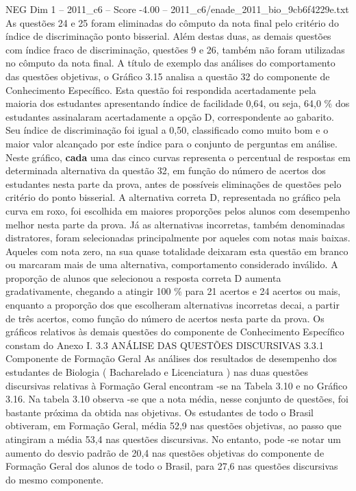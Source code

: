 \begin{textsample}{NEG Dim 1 – 2011\_c6 – Score -4.00 – 2011\_c6/enade\_2011\_bio\_9cb6f4229e.txt}
As questões 24 e 25 foram eliminadas do cômputo da nota final pelo critério do índice de discriminação ponto bisserial.
Além destas duas, as demais questões com índice fraco de discriminação, questões 9 e 26, também não foram utilizadas no cômputo da nota final.
A título de exemplo das análises do comportamento das questões objetivas, o Gráfico 3.15 analisa a questão 32 do componente de Conhecimento Específico.
Esta questão foi respondida acertadamente pela maioria dos estudantes apresentando índice de facilidade 0,64, ou seja, 64,0 \% dos estudantes assinalaram acertadamente a opção D, correspondente ao gabarito.
Seu índice de discriminação foi igual a 0,50, classificado como muito bom e o maior valor alcançado por este índice para o conjunto de perguntas em análise.
Neste gráfico, \textbf{cada} uma das cinco curvas representa o percentual de respostas em determinada alternativa da questão 32, em função do número de acertos dos estudantes nesta parte da prova, antes de possíveis eliminações de questões pelo critério do ponto bisserial.
A alternativa correta D, representada no gráfico pela curva em roxo, foi escolhida em maiores proporções pelos alunos com desempenho melhor nesta parte da prova.
Já as alternativas incorretas, também denominadas distratores, foram selecionadas principalmente por aqueles com notas mais baixas.
Aqueles com nota zero, na sua quase totalidade deixaram esta questão em branco ou marcaram mais de uma alternativa, comportamento considerado inválido.
A proporção de alunos que selecionou a resposta correta D aumenta gradativamente, chegando a atingir 100 \% para 21 acertos e 24 acertos ou mais, enquanto a proporção dos que escolheram alternativas incorretas decai, a partir de três acertos, como função do número de acertos nesta parte da prova.
Os gráficos relativos às demais questões do componente de Conhecimento Específico constam do Anexo I. 3.3 ANÁLISE DAS QUESTÕES DISCURSIVAS 3.3.1 Componente de Formação Geral As análises dos resultados de desempenho dos estudantes de Biologia ( Bacharelado e Licenciatura ) nas duas questões discursivas relativas à Formação Geral encontram -se na Tabela 3.10 e no Gráfico 3.16.
Na tabela 3.10 observa -se que a nota média, nesse conjunto de questões, foi bastante próxima da obtida nas objetivas.
Os estudantes de todo o Brasil obtiveram, em Formação Geral, média 52,9 nas questões objetivas, ao passo que atingiram a média 53,4 nas questões discursivas.
No entanto, pode -se notar um aumento do desvio padrão de 20,4 nas questões objetivas do componente de Formação Geral dos alunos de todo o Brasil, para 27,6 nas questões discursivas do mesmo componente.

\end{textsample}

